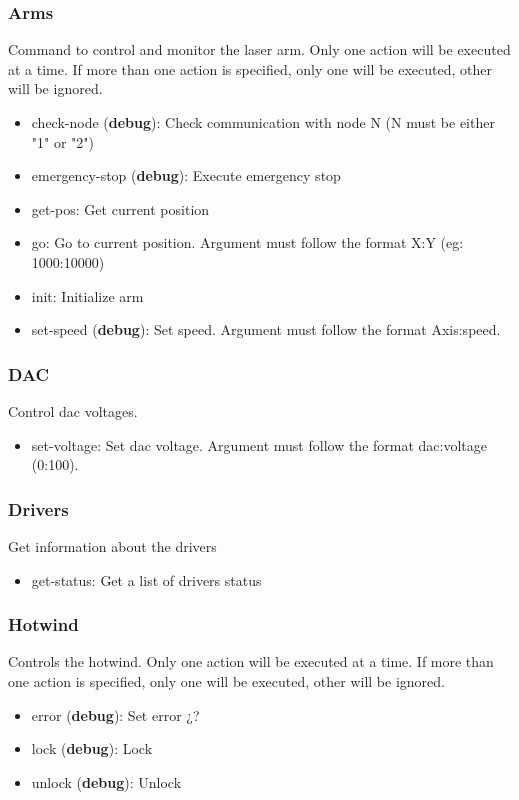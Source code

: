 \documentclass[letterpaper, 10 pt]{article}
\begin{document}
\subsubsection{Arms}
Command to control and monitor the laser arm. Only one action will be executed at a time. If more than one action is specified, only one will be executed, other will be ignored.
\begin{itemize}
	\item check-node (\textbf{debug}): Check communication with node N (N must be either "1" or "2")
	\item emergency-stop (\textbf{debug}): Execute emergency stop
	\item get-pos: Get current position
	\item go: Go to current position. Argument must follow the format X:Y (eg: 1000:10000)
	\item init: Initialize arm
	\item set-speed (\textbf{debug}): Set speed. Argument must follow the format Axis:speed.
\end{itemize}
\subsubsection{DAC}
Control dac voltages.
\begin{itemize}
	\item set-voltage: Set dac voltage. Argument must follow the format dac:voltage (0:100).
\end{itemize}

\subsubsection{Drivers}
Get information about the drivers
\begin{itemize}
	\item get-status: Get a list of drivers status
\end{itemize}

\subsubsection{Hotwind}
Controls the hotwind. Only one action will be executed at a time. If more than one action is specified, only one will be executed, other will be ignored.
\begin{itemize}
	\item error (\textbf{debug}): Set error ¿?
	\item lock (\textbf{debug}): Lock
	\item unlock (\textbf{debug}): Unlock
\end{itemize}
\end{document}
